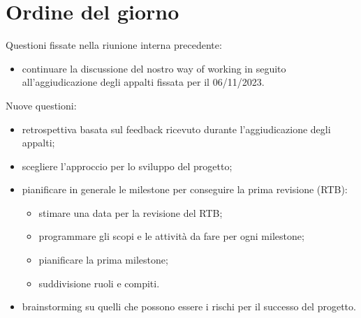 \documentclass[12pt]{article}
\begin{document}
    \section{Ordine del giorno}
        Questioni fissate nella riunione interna precedente:
    	\begin{itemize}
    		\item continuare la discussione del nostro way of working in seguito all'aggiudicazione degli appalti fissata per il 06/11/2023.
    	\end{itemize}
    	Nuove questioni:
    	\begin{itemize}
			\item retrospettiva basata sul feedback ricevuto durante l'aggiudicazione degli appalti;
    		\item scegliere l'approccio per lo sviluppo del progetto;
    		\item pianificare in generale le milestone per conseguire la prima revisione (RTB):
    		\begin{itemize}
				\item stimare una data per la revisione del RTB;
				\item programmare gli scopi e le attività da fare per ogni milestone;
				\item pianificare la prima milestone;
				\item suddivisione ruoli e compiti.
			\end{itemize}
			\item brainstorming su quelli che possono essere i rischi per il successo del progetto.
    	\end{itemize}
    
\end{document}
